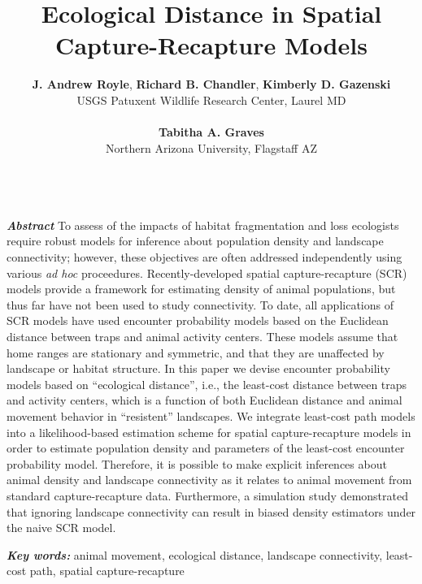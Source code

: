 \documentclass[12pt]{article}
\title{Ecological Distance in Spatial Capture-Recapture Models}
\author{
{\bf J. Andrew Royle}, {\bf Richard B. Chandler},
{\bf Kimberly D. Gazenski} \\
USGS Patuxent Wildlife Research Center, Laurel MD \\ \\
{\bf Tabitha A. Graves} \\
Northern Arizona University, Flagstaff AZ \\ \\
}
\begin{document}
\maketitle

\date


\linenumbers


\begin{spacing}{1.8}

\begin{flushleft}
{\em \bf Abstract}
To assess of the impacts of habitat fragmentation and loss
ecologists require robust models for inference about
population density and landscape connectivity; however, these
objectives are often addressed independently using various \textit{ad hoc}
proceedures. Recently-developed spatial capture-recapture (SCR) models
provide a framework for estimating density of animal populations, %
but thus far have not been used to study connectivity.  To date, all
applications of SCR models have used encounter probability models
based on the Euclidean distance between traps and animal activity
centers. These models assume that home ranges are stationary and
symmetric, and that they are unaffected by landscape or habitat
structure. In this paper we devise encounter probability models based
on ``ecological distance'', i.e., the least-cost distance between
traps and activity centers, which is a function of both Euclidean
distance and animal movement behavior in %
``resistent'' landscapes. We
integrate least-cost path models into a likelihood-based estimation
scheme for spatial capture-recapture models in order to estimate
population density and parameters of the least-cost encounter
probability model.  Therefore, it is possible to make explicit
inferences about animal density %
and landscape connectivity as it relates to animal movement
from standard
capture-recapture data.  Furthermore, a simulation study demonstrated
that ignoring landscape connectivity can result in biased density
estimators under the naive SCR model. %

{\em \bf Key words:} animal movement, ecological distance, landscape connectivity,
least-cost path, spatial capture-recapture

\end{flushleft}




\end{spacing}
\end{document}
